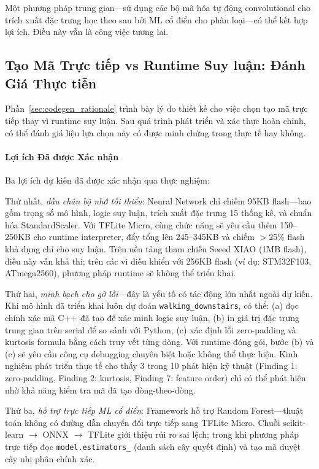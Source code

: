 Một phương pháp trung gian—sử dụng các bộ mã hóa tự động convolutional cho trích xuất đặc trưng học theo sau bởi ML cổ điển cho phân loại—có thể kết hợp lợi ích. Điều này vẫn là công việc tương lai.

\subsection{Tạo Mã Trực tiếp vs Runtime Suy luận: Đánh Giá Thực tiễn}
\label{sec:codegen_tradeoff_discussion}

Phần~\ref{sec:codegen_rationale} trình bày lý do thiết kế cho việc chọn tạo mã trực tiếp thay vì runtime suy luận. Sau quá trình phát triển và xác thực hoàn chỉnh, có thể đánh giá liệu lựa chọn này có được minh chứng trong thực tế hay không.

\paragraph{Lợi ích Đã được Xác nhận}
Ba lợi ích dự kiến đã được xác nhận qua thực nghiệm:

Thứ nhất, \textit{dấu chân bộ nhớ tối thiểu}: Neural Network chỉ chiếm 95KB flash---bao gồm trọng số mô hình, logic suy luận, trích xuất đặc trưng 15 thống kê, và chuẩn hóa StandardScaler. Với TFLite Micro, cùng chức năng sẽ yêu cầu thêm 150--250KB cho runtime interpreter, đẩy tổng lên 245--345KB và chiếm $>$25\% flash khả dụng chỉ cho suy luận. Trên nền tảng tham chiếu Seeed XIAO (1MB flash), điều này vẫn khả thi; trên các vi điều khiển với 256KB flash (ví dụ: STM32F103, ATmega2560), phương pháp runtime sẽ không thể triển khai.

Thứ hai, \textit{minh bạch cho gỡ lỗi}---đây là yếu tố có tác động lớn nhất ngoài dự kiến. Khi mô hình đã triển khai luôn dự đoán \texttt{walking\_downstairs}, có thể: (a) đọc chính xác mã C++ đã tạo để xác minh logic suy luận, (b) in giá trị đặc trưng trung gian trên serial để so sánh với Python, (c) xác định lỗi zero-padding và kurtosis formula bằng cách truy vết từng dòng. Với runtime đóng gói, bước (b) và (c) sẽ yêu cầu công cụ debugging chuyên biệt hoặc không thể thực hiện. Kinh nghiệm phát triển thực tế cho thấy 3 trong 10 phát hiện kỹ thuật (Finding 1: zero-padding, Finding 2: kurtosis, Finding 7: feature order) chỉ có thể phát hiện nhờ khả năng kiểm tra mã đã tạo dòng-theo-dòng.

Thứ ba, \textit{hỗ trợ trực tiếp ML cổ điển}: Framework hỗ trợ Random Forest---thuật toán không có đường dẫn chuyển đổi trực tiếp sang TFLite Micro. Chuỗi scikit-learn $\rightarrow$ ONNX $\rightarrow$ TFLite giới thiệu rủi ro sai lệch; trong khi phương pháp trực tiếp đọc \texttt{model.estimators\_} (danh sách cây quyết định) và tạo mã duyệt cây nhị phân chính xác.

